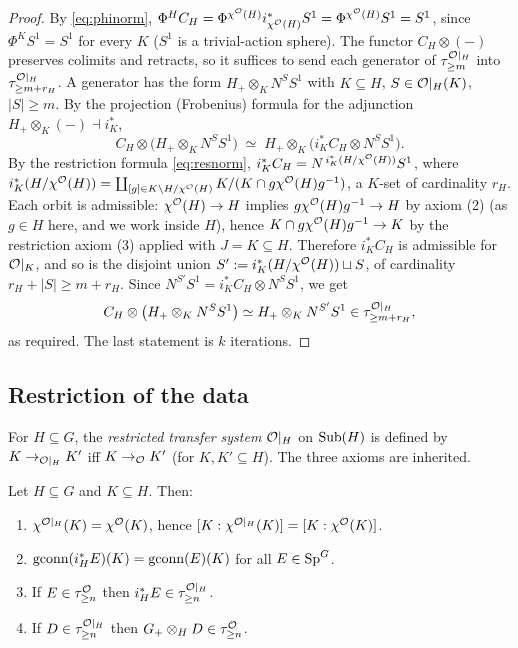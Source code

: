 \begin{proof}
By \eqref{eq:phinorm}, $\Phi^H C_H=\Phi^{\chi^{\mathcal{O}}(H)}i_{\chi^{\mathcal{O}}(H)}^\ast S^1
=\Phi^{\chi^{\mathcal{O}}(H)}S^1=S^1$, since $\Phi^K S^1=S^1$ for every $K$ ($S^1$ is a
trivial-action sphere). The functor $C_H\otimes(-)$ preserves colimits and
retracts, so it suffices to send each generator of $\tau^{\mathcal{O}|_H}_{\ge m}$ into
$\tau^{\mathcal{O}|_H}_{\ge m+r_H}$. A generator has the form $H_+\otimes_K N^S S^1$ with
$K\subseteq H$, $S\in\mathcal{O}|_H(K)$, $|S|\ge m$. By the projection (Frobenius)
formula for the adjunction $H_+\otimes_K(-)\dashv i_K^\ast$,
\[
C_H\otimes\bigl(H_+\otimes_K N^S S^1\bigr)\;\simeq\;
H_+\otimes_K\bigl(i_K^\ast C_H\otimes N^S S^1\bigr).
\]
By the restriction formula \eqref{eq:resnorm},
$i_K^\ast C_H=N^{\,i_K^\ast(H/\chi^{\mathcal{O}}(H))}S^1$, where
$i_K^\ast(H/\chi^{\mathcal{O}}(H))=\coprod_{[g]\in K\backslash H/\chi^{\mathcal{O}}(H)}
K/(K\cap g\chi^{\mathcal{O}}(H)g^{-1})$, a $K$-set of cardinality $r_H$. Each orbit is
admissible: $\chi^{\mathcal{O}}(H)\to H$ implies $g\chi^{\mathcal{O}}(H)g^{-1}\to H$ by axiom (2)
(as $g\in H$ here, and we work inside $H$), hence
$K\cap g\chi^{\mathcal{O}}(H)g^{-1}\to K$ by the restriction axiom (3) applied with
$J=K\subseteq H$. Therefore $i_K^\ast C_H$ is admissible for $\mathcal{O}|_K$, and so is
the disjoint union $S':=i_K^\ast(H/\chi^{\mathcal{O}}(H))\sqcup S$, of cardinality
$r_H+|S|\ge m+r_H$. Since $N^{S'}S^1=i_K^\ast C_H\otimes N^S S^1$, we get
\[
C_H\otimes\bigl(H_+\otimes_K N^S S^1\bigr)\simeq H_+\otimes_K N^{S'}S^1
\in\tau^{\mathcal{O}|_H}_{\ge m+r_H},
\]
as required. The last statement is $k$ iterations.
\end{proof}

\subsection*{Restriction of the data}

\begin{qfivedefinition}\label{def:restr}
For $H\subseteq G$, the \emph{restricted transfer system} $\mathcal{O}|_H$ on
$\operatorname{Sub}(H)$ is defined by $K\to_{\mathcal{O}|_H}K'$ iff $K\to_{\mathcal{O}}K'$ (for $K,K'\subseteq
H$). The three axioms are inherited.
\end{qfivedefinition}

\begin{qfivelemma}\label{lem:restr}
Let $H\subseteq G$ and $K\subseteq H$. Then:
\begin{enumerate}\setlength\itemsep{2pt}
\item $\chi^{\mathcal{O}|_H}(K)=\chi^{\mathcal{O}}(K)$, hence $[K:\chi^{\mathcal{O}|_H}(K)]=[K:\chi^{\mathcal{O}}(K)]$.
\item $\operatorname{gconn}(i_H^\ast E)(K)=\operatorname{gconn}(E)(K)$ for all $E\in\mathrm{Sp}^G$.
\item If $E\in\tau^{\mathcal{O}}_{\ge n}$ then $i_H^\ast E\in\tau^{\mathcal{O}|_H}_{\ge n}$.
\item If $D\in\tau^{\mathcal{O}|_H}_{\ge n}$ then $G_+\otimes_H D\in\tau^{\mathcal{O}}_{\ge n}$.
\end{enumerate}
\end{qfivelemma}

